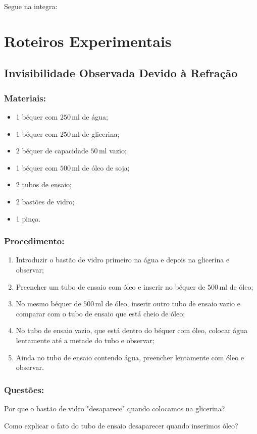 \begin{anexosenv}
    Segue na integra:
    

    \chapter{Roteiros Experimentais}
    \label{anx:roteiros-experimentais}
    \section{Invisibilidade Observada Devido à Refração}
    \label{anx:invisibilidade-refracao}
    \subsection*{Materiais:}
    \begin{itemize}
        \item 1 béquer com $250\,\mathrm{ml}$ de água;
        \item 1 béquer com $250\,\mathrm{ml}$ de glicerina;
        \item 2 béquer de capacidade $50\,\mathrm{ml}$ vazio;
        \item 1 béquer com $500\,\mathrm{ml}$ de óleo de soja;
        \item 2 tubos de ensaio;
        \item 2 bastões de vidro;
        \item 1 pinça.
    \end{itemize}
    \subsection*{Procedimento:}
    \begin{enumerate}
        \item Introduzir o bastão de vidro primeiro na água e depois na glicerina e observar;
        \item Preencher um tubo de ensaio com óleo e inserir no béquer de $500\,\mathrm{ml}$ de óleo;
        \item No mesmo béquer de $500\,\mathrm{ml}$ de óleo, inserir outro tubo de ensaio vazio e comparar com o tubo de ensaio que está cheio de óleo;
        \item No tubo de ensaio vazio, que está dentro do béquer com óleo, colocar água lentamente até a metade do tubo e observar;
        \item Ainda no tubo de ensaio contendo água, preencher lentamente com óleo e observar. 
    \end{enumerate}
    \subsection*{Questões:}
    \begin{quest}
        Por que o bastão de vidro "desaparece" quando colocamos na glicerina?
    \end{quest}
    \begin{quest}
        Como explicar o fato do tubo de ensaio desaparecer quando inserimos óleo?
    \end{quest}
\end{anexosenv}